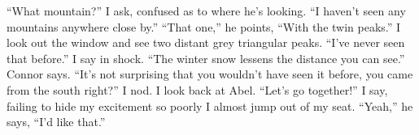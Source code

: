 \documentclass[openany, 12pt]{book}
\newcommand\tab[1][1cm]{\hspace*{#1}}
\begin{document}
\newline
\tab
``What mountain?'' I ask, confused as to where he’s looking. ``I haven’t seen any mountains anywhere close by.''
\newline
\tab
``That one,'' he points, ``With the twin peaks.'' I look out the window and see two distant grey triangular peaks.
\newline
\tab
``I’ve never seen that before.'' I say in shock.
\newline
\tab
``The winter snow lessens the distance you can see.'' Connor says. ``It’s not surprising that you wouldn’t have seen it before, you came from the south right?'' I nod.
\newline
\tab
I look back at Abel. ``Let’s go together!'' I say, failing to hide my excitement so poorly I almost jump out of my seat.
\newline
\tab
``Yeah,'' he says, ``I’d like that.''
\end{document}
